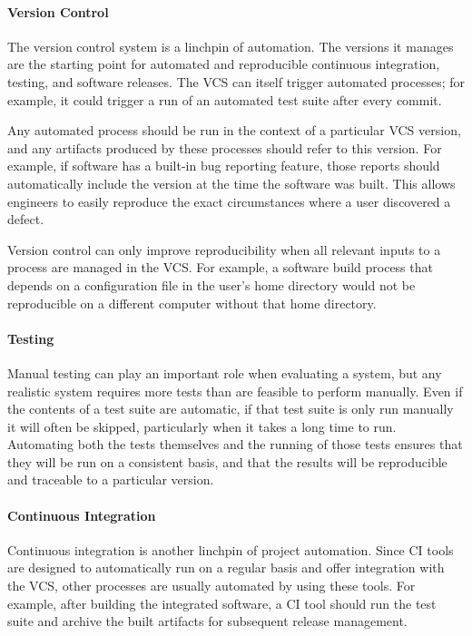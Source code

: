 \paragraph{Version Control}

The version control system is a linchpin of automation. The versions
it manages are the starting point for automated and reproducible
continuous integration, testing, and software releases. The VCS can
itself trigger automated processes; for example, it could trigger a
run of an automated test suite after every commit.

Any automated process should be run in the context of a particular VCS
version, and any artifacts produced by these processes should refer to
this version. For example, if software has a built-in bug reporting
feature, those reports should automatically include the version at the
time the software was built. This allows engineers to easily reproduce
the exact circumstances where a user discovered a defect.

Version control can only improve reproducibility when all relevant
inputs to a process are managed in the VCS. For example, a software
build process that depends on a configuration file in the user's home
directory would not be reproducible on a different computer without
that home directory.

\paragraph{Testing}

Manual testing can play an important role when evaluating a system,
but any realistic system requires more tests than are feasible to
perform manually. Even if the contents of a test suite are automatic,
if that test suite is only run manually it will often be skipped,
particularly when it takes a long time to run. Automating both the
tests themselves and the running of those tests ensures that they will
be run on a consistent basis, and that the results will be
reproducible and traceable to a particular version.

\paragraph{Continuous Integration}

Continuous integration is another linchpin of project
automation. Since CI tools are designed to automatically run on a
regular basis and offer integration with the VCS, other processes are
usually automated by using these tools. For example, after building
the integrated software, a CI tool should run the test suite and
archive the built artifacts for subsequent release management.

